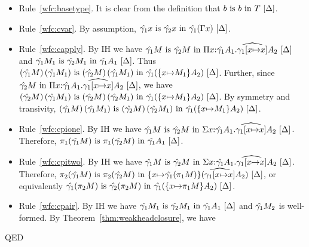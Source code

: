 \documentclass{article}
\theoremstyle{break}
\newcommand{\qed}{\mbox{QED}}
\newcommand{\env}{\gamma}
\newenvironment{proof}{\noindent{\bf Proof:}\hspace*{0.5em}}{\hspace*{\fill}\qed}
\begin{document}
\begin{proof}
\begin{itemize}
\item Rule~\ref{wfc:basetype}.
It is clear from the definition that 
${b}\mathrm{\ is\ }{b}\mathrm{\ in\ }{T}\ [\Delta]$.
\item Rule~\ref{wfc:cvar}.
By assumption,
$\semanticequivterm{\world}{\hat{\env_1}\cvar}{\hat{\env_2}\cvar}{\hat{\env_1}(\context\cvar)}$.
\item Rule~\ref{wfc:capply}.
By IH we have
$\semanticequivterm{\world}{\envone\constructor}{\envtwo\constructor}
  {\kpi{\cvar}{\envone{\kind_1}}{\envonex{\kind_2}}}$ and
$\semanticequivterm{\world}{\envone\constructor_1}{\envtwo\constructor_1}{\envone\kind_1}$.
Thus
$\semanticequivterm{\world}{\capply{(\envone\constructor)}{(\envone{\constructor_1})}}
   {\capply{(\envtwo\constructor)}{(\envone{\constructor_1})}}
   {\envone(\substitute{\cvar}{\constructor_1}{\kind_2})}$.
Further, since 
$\semanticvalidterm{\world}{\envtwo\constructor}{\kpi{\cvar}{\envone{\kind_1}}{\envonex{\kind_2}}}$,
we have
$\semanticequivterm{\world}{\capply{(\envtwo\constructor)}{(\envone{\constructor_1})}}
   {\capply{(\envtwo\constructor)}{(\envtwo{\constructor_1})}}
   {\envone(\substitute{\cvar}{\constructor_1}{\kind_2})}$.
By symmetry and transivity,
$\semanticequivterm{\world}{\capply{(\envone\constructor)}{(\envone{\constructor_1})}}
   {\capply{(\envtwo\constructor)}{(\envtwo{\constructor_1})}}
   {\envone(\substitute{\cvar}{\constructor_1}{\kind_2})}$.
\item Rule~\ref{wfc:cpione}.
By IH we have
$\semanticequivterm{\world}{\envone\constructor}{\envtwo\constructor}
    {\ksigma{\cvar}{\envone{\kind_1}}{\envonex{\kind_2}}}$.
Therefore, 
$\semanticequivterm{\world}{\cpi{1}{(\envone\constructor)}}{\cpi{1}{(\envtwo\constructor)}}{\envone\kind_1}$.
\item Rule~\ref{wfc:cpitwo}.
By IH we have
$\semanticequivterm{\world}{\envone\constructor}{\envtwo\constructor}
    {\ksigma{\cvar}{\envone{\kind_1}}{\envonex{\kind_2}}}$.
Therefore, 
$\semanticequivterm{\world}{\cpi{2}{(\envone\constructor)}}{\cpi{2}{(\envtwo\constructor)}}
   {\substitute{\cvar}{\envone(\cpi{1}{\constructor})}{(\envonex{\kind_2})}}$, or equivalently
$\semanticequivterm{\world}{\envone(\cpi{2}{\constructor})}{\envtwo(\cpi{2}{\constructor})}
   {\envone(\substitute{\cvar}{\cpi{1}{\constructor}}{\kind_2})}$.
\item Rule~\ref{wfc:cpair}.
By IH we have
$\semanticequivterm{\world}{\envone\constructor_1}{\envtwo\constructor_1}{\envone\kind_1}$
and $\envone\constructor_2$ is well-formed.
By Theorem~\ref{thm:weakheadclosure}, we have

\end{itemize}
\end{proof}
\end{document}
